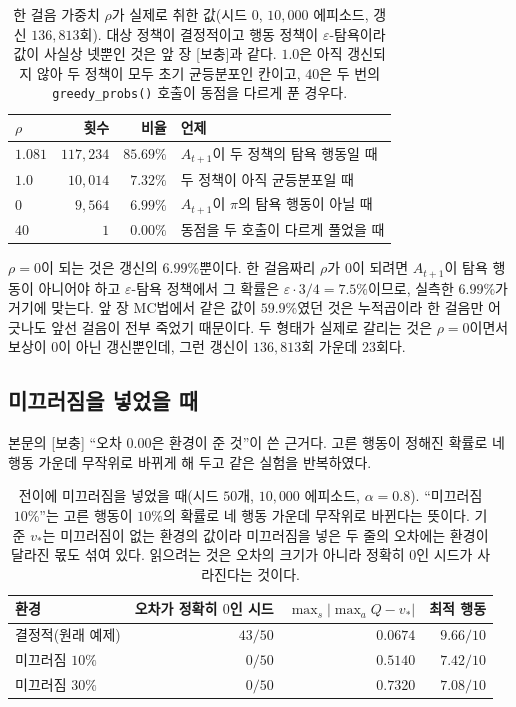 \documentclass[11pt,a4paper]{article}
\begin{document}
\begin{table}[htbp]
\centering
\caption{한 걸음 가중치 $\rho$가 실제로 취한 값(시드 $0$, $10{,}000$ 에피소드, 갱신 $136{,}813$회).
대상 정책이 결정적이고 행동 정책이 $\varepsilon$-탐욕이라 값이 사실상 넷뿐인 것은 앞 장 [보충]과
같다. $1.0$은 아직 갱신되지 않아 두 정책이 모두 초기 균등분포인 칸이고, $40$은 두 번의
\lstinline|greedy_probs()| 호출이 동점을 다르게 푼 경우다.}
\label{tab:rho-dist}
\small
\begin{tabular}{@{}lrrl@{}}
\toprule
$\rho$ & 횟수 & 비율 & 언제 \\
\midrule
$1.081$ & $117{,}234$ & $85.69\%$ & $A_{t+1}$이 두 정책의 탐욕 행동일 때 \\
$1.0$   & $10{,}014$  & $7.32\%$  & 두 정책이 아직 균등분포일 때 \\
$0$     & $9{,}564$   & $6.99\%$  & $A_{t+1}$이 $\pi$의 탐욕 행동이 아닐 때 \\
$40$    & $1$         & $0.00\%$  & 동점을 두 호출이 다르게 풀었을 때 \\
\bottomrule
\end{tabular}
\end{table}

$\rho=0$이 되는 것은 갱신의 $6.99\%$뿐이다. 한 걸음짜리 $\rho$가 $0$이 되려면 $A_{t+1}$이 탐욕
행동이 아니어야 하고 $\varepsilon$-탐욕 정책에서 그 확률은 $\varepsilon \cdot 3/4 = 7.5\%$이므로,
실측한 $6.99\%$가 거기에 맞는다. 앞 장 MC법에서 같은 값이 $59.9\%$였던 것은 누적곱이라 한 걸음만
어긋나도 앞선 걸음이 전부 죽었기 때문이다. 두 형태가 실제로 갈리는 것은 $\rho=0$이면서 보상이
$0$이 아닌 갱신뿐인데, 그런 갱신이 $136{,}813$회 가운데 $23$회다.

\subsection{미끄러짐을 넣었을 때}
\label{app:exact}

본문의 [보충] ``오차 $0.00$은 환경이 준 것''이 쓴 근거다. 고른 행동이 정해진 확률로 네 행동 가운데
무작위로 바뀌게 해 두고 같은 실험을 반복하였다.

\begin{table}[htbp]
\centering
\caption{전이에 미끄러짐을 넣었을 때(시드 $50$개, $10{,}000$ 에피소드, $\alpha=0.8$). ``미끄러짐
$10\%$''는 고른 행동이 $10\%$의 확률로 네 행동 가운데 무작위로 바뀐다는 뜻이다. 기준 $v_*$는
미끄러짐이 없는 환경의 값이라 미끄러짐을 넣은 두 줄의 오차에는 환경이 달라진 몫도 섞여 있다.
읽으려는 것은 오차의 크기가 아니라 정확히 $0$인 시드가 사라진다는 것이다.}
\label{tab:slip}
\small
\begin{tabular}{@{}lrrr@{}}
\toprule
환경 & 오차가 정확히 $0$인 시드 & $\max_s|\max_a Q - v_*|$ & 최적 행동 \\
\midrule
결정적(원래 예제) & $43/50$ & $0.0674$ & $9.66/10$ \\
미끄러짐 $10\%$   & $0/50$  & $0.5140$ & $7.42/10$ \\
미끄러짐 $30\%$   & $0/50$  & $0.7320$ & $7.08/10$ \\
\bottomrule
\end{tabular}
\end{table}
\end{document}
